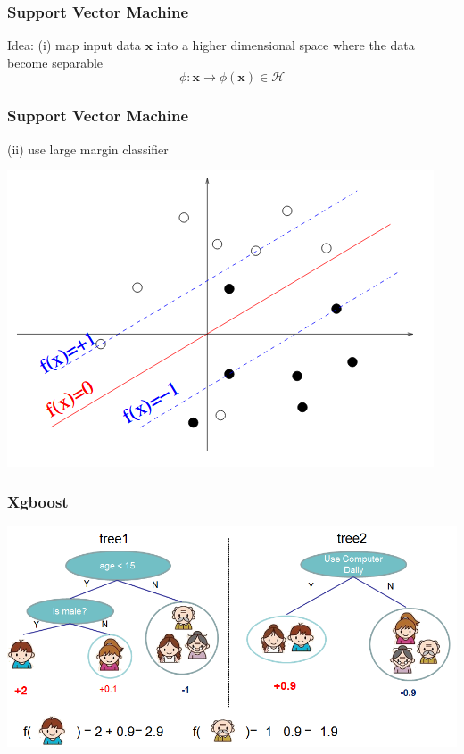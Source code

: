 \documentclass{beamer}
\begin{document}
\begin{frame}
\frametitle{Support Vector Machine \cite{Cortes1995}}

Idea: (i) map input data $\textbf{x}$ into a higher dimensional space where the data become separable 
\begin{equation*}
\phi : \mathbf{x}\rightarrow\phi(\mathbf{x})\in\mathcal{H}
\end{equation*}

\end{frame}

\begin{frame}
\frametitle{Support Vector Machine \cite{Cortes1995}}

(ii) use large margin classifier

\centering
\includegraphics[width=0.8\linewidth]{images/svm}

\end{frame}

\begin{frame}
\frametitle{Xgboost \cite{chen2016xgboost}}

\centering
\includegraphics[width=0.8\linewidth]{images/xgb}

\end{frame}
\end{document}

